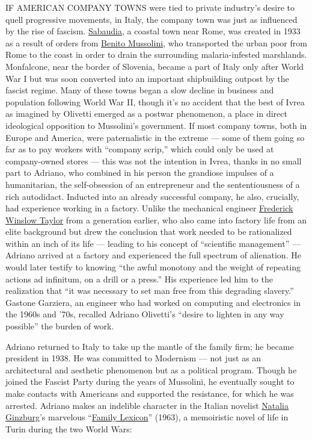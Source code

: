 IF AMERICAN COMPANY TOWNS were tied to private industry's desire to
quell progressive movements, in Italy, the company town was just as
influenced by the rise of fascism.
\href{https://intransit.blogs.nytimes.com/2008/06/13/sun-sand-and-mussolini/}{Sabaudia},
a coastal town near Rome, was created in 1933 as a result of orders from
\href{https://www.nytimes.com/topic/person/benito-mussolini}{Benito
Mussolini}, who transported the urban poor from Rome to the coast in
order to drain the surrounding malaria-infested marshlands. Monfalcone,
near the border of Slovenia, became a part of Italy only after World War
I but was soon converted into an important shipbuilding outpost by the
fascist regime. Many of these towns began a slow decline in business and
population following World War II, though it's no accident that the best
of Ivrea as imagined by Olivetti emerged as a postwar phenomenon, a
place in direct ideological opposition to Mussolini's government. If
most company towns, both in Europe and America, were paternalistic in
the extreme --- some of them going so far as to pay workers with
``company scrip,'' which could only be used at company-owned stores ---
this was not the intention in Ivrea, thanks in no small part to Adriano,
who combined in his person the grandiose impulses of a humanitarian, the
self-obsession of an entrepreneur and the sententiousness of a rich
autodidact. Inducted into an already successful company, he also,
crucially, had experience working in a factory. Unlike the mechanical
engineer
\href{https://archive.nytimes.com/www.nytimes.com/learning/general/onthisday/bday/0320.html}{Frederick
Winslow Taylor} from a generation earlier, who also came into factory
life from an elite background but drew the conclusion that work needed
to be rationalized within an inch of its life --- leading to his concept
of ``scientific management'' --- Adriano arrived at a factory and
experienced the full spectrum of alienation. He would later testify to
knowing ``the awful monotony and the weight of repeating actions ad
infinitum, on a drill or a press.'' His experience led him to the
realization that ``it was necessary to set man free from this degrading
slavery.'' Gastone Garziera, an engineer who had worked on computing and
electronics in the 1960s and '70s, recalled Adriano Olivetti's ``desire
to lighten in any way possible'' the burden of work.

Adriano returned to Italy to take up the mantle of the family firm; he
became president in 1938. He was committed to Modernism --- not just as
an architectural and aesthetic phenomenon but as a political program.
Though he joined the Fascist Party during the years of Mussolini, he
eventually sought to make contacts with Americans and supported the
resistance, for which he was arrested. Adriano makes an indelible
character in the Italian novelist
\href{https://www.nytimes.com/1991/10/09/books/natalia-ginzburg-75-novelist-essayist-and-translator-is-dead.html}{Natalia
Ginzburg}'s marvelous
``\href{https://www.nyrb.com/products/a_family_lexicon?variant=1094928849}{Family
Lexicon}'' (1963), a memoiristic novel of life in Turin during the two
World Wars:

